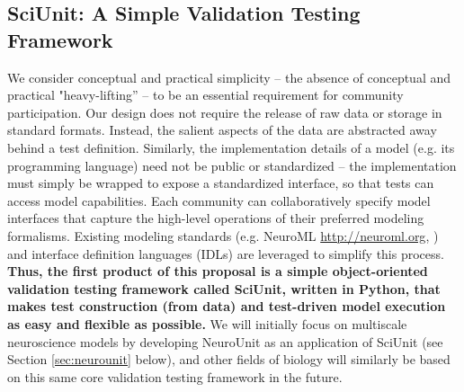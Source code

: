 \documentclass[11pt,letterpaper]{article}
\begin{document}
\subsection{SciUnit: A Simple Validation Testing Framework}
We consider conceptual and practical simplicity -- the absence of conceptual and practical "heavy-lifting'' -- to be an essential requirement for community participation. Our design does not require the release of raw data or storage in standard formats. Instead, the salient aspects of the data are abstracted away behind a test definition. Similarly, the implementation details of a model (e.g. its programming language) need not be public or standardized -- the implementation must simply be wrapped to expose a standardized interface, so that tests can access model capabilities. Each community can collaboratively specify model interfaces that capture the high-level operations of their preferred modeling formalisms. Existing modeling standards (e.g. NeuroML \url{http://neuroml.org}, \cite{gleeson_neuroml:_2010}) and interface definition languages (IDLs) \cite{bachmann2008} are leveraged to simplify this process. \textbf{Thus, the first product of this proposal is a simple object-oriented validation testing framework called \textbf{SciUnit}, written in Python, that makes test construction (from data) and test-driven model execution as easy and flexible as possible.} We will initially focus on multiscale neuroscience models by developing NeuroUnit as an application of SciUnit (see Section \ref{sec:neurounit} below), and other fields of biology will similarly be based on this same core validation testing framework in the future.    
\end{document}
